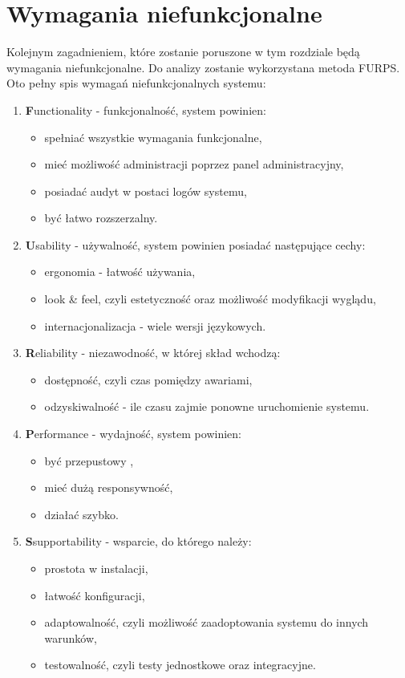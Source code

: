 \section{Wymagania niefunkcjonalne}
Kolejnym zagadnieniem, które zostanie poruszone w tym rozdziale będą wymagania niefunkcjonalne. Do analizy zostanie wykorzystana metoda FURPS. Oto pełny spis wymagań niefunkcjonalnych systemu:
\begin{enumerate}
	\item \textbf{F}unctionality - funkcjonalność, system powinien:
		\begin{itemize}
			\item spełniać wszystkie wymagania funkcjonalne,
			\item mieć możliwość administracji poprzez panel administracyjny,
			\item posiadać audyt w postaci logów systemu,
			\item być łatwo rozszerzalny.
		\end{itemize}
	\item \textbf{U}sability - używalność, system powinien posiadać następujące cechy:
		\begin{itemize}
			\item ergonomia - łatwość używania,
			\item look \& feel, czyli estetyczność oraz możliwość modyfikacji wyglądu,
			\item internacjonalizacja - wiele wersji językowych.
		\end{itemize}
	\item \textbf{R}eliability - niezawodność, w której skład wchodzą:
		\begin{itemize}
			\item dostępność, czyli czas pomiędzy awariami,
			\item odzyskiwalność - ile czasu zajmie ponowne uruchomienie systemu.
		\end{itemize}
	\item \textbf{P}erformance - wydajność, system powinien:
		\begin{itemize}
			\item być przepustowy ,
			\item mieć dużą responsywność,
			\item działać szybko.
		\end{itemize}
	\item \textbf{S}supportability - wsparcie, do którego należy:
		\begin{itemize}
			\item prostota w instalacji,
			\item łatwość konfiguracji,
			\item adaptowalność, czyli możliwość zaadoptowania systemu do innych warunków,
			\item testowalność, czyli testy jednostkowe oraz integracyjne.
		\end{itemize}
\end{enumerate}
